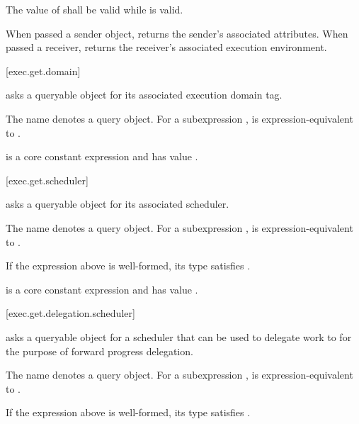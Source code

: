 \pnum
The value of  shall be valid while  is valid.

\pnum
\begin{note}
When passed a sender object,
 returns the sender's associated attributes.
When passed a receiver,
 returns the receiver's associated execution environment.
\end{note}

[exec.get.domain]{}

\pnum
{} asks a queryable object
for its associated execution domain tag.

\pnum
The name  denotes a query object.
For a subexpression ,
 is expression-equivalent to
.

\pnum
{} is
a core constant expression and has value .

[exec.get.scheduler]{}

\pnum
{} asks a queryable object for its associated scheduler.

\pnum
The name  denotes a query object.
For a subexpression ,
 is expression-equivalent to
.

\mandates
If the expression above is well-formed,
its type satisfies .

\pnum
{} is
a core constant expression and has value .

[exec.get.delegation.scheduler]{}

\pnum
{} asks a queryable object for a scheduler
that can be used to delegate work to
for the purpose of forward progress delegation.

\pnum
The name  denotes a query object.
For a subexpression ,
 is expression-equivalent to
.

\mandates
If the expression above is well-formed,
its type satisfies .

